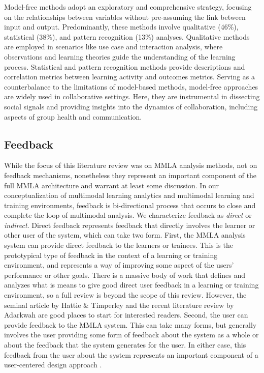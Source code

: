 \documentclass[manuscript,screen,review]{acmart}
\begin{document}
Model-free methods adopt an exploratory and comprehensive strategy, focusing on the relationships between variables without pre-assuming the link between input and output. Predominantly, these methods involve qualitative (46\%), statistical (38\%), and pattern recognition (13\%) analyses. Qualitative methods are employed in scenarios like use case and interaction analysis, where observations and learning theories guide the understanding of the learning process. Statistical and pattern recognition methods provide descriptions and correlation metrics between learning activity and outcomes metrics. Serving as a counterbalance to the limitations of model-based methods, model-free approaches are widely used in collaborative settings. Here, they are instrumental in dissecting social signals and providing insights into the dynamics of collaboration, including aspects of group health and communication.




\subsection{Feedback}

While the focus of this literature review was on MMLA analysis methods, not on feedback mechanisms, nonetheless they represent an important component of the full MMLA architecture and warrant at least some discussion. In our conceptualization of multimodal learning analytics and multimodal learning and training environments, feedback is bi-directional process that occurs to close and complete the loop of multimodal analysis. We characterize feedback as \textit{direct} or \textit{indirect}. Direct feedback represents feedback that directly involves the learner or other user of the system, which can take two form. First, the MMLA analysis system can provide direct feedback to the learners or trainees. This is the prototypical type of feedback in the context of a learning or training environment, and represents a way of improving some aspect of the users' performance or other goals. There is a massive body of work that defines and analyzes what is means to give good direct user feedback in a learning or training environment, so a full review is beyond the scope of this review. However, the seminal article by Hattie \& Timperley \cite{hattie2007} and the recent literature review by Adarkwah \cite{Adarkwah2021} are good places to start for interested readers. Second, the user can provide feedback to the MMLA system. This can take many forms, but generally involves the user providing some form of feedback about the system as a whole or about the feedback that the system generates for the user. In either case, this feedback from the user about the system represents an important component of a user-centered design approach \cite{abras2004user}.
\end{document}
